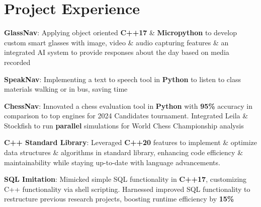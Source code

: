 \documentclass[letterpaper,11pt]{article}
\begin{document}
\section{Project Experience}
 \begin{itemize}[leftmargin=0.15in, label={}]
    \small{\item{

    \textbf{GlassNav}{: Applying object oriented \textbf{C++17} \& 
\textbf{Micropython} to develop custom smart glasses with image, video \& 
audio capturing features \& an integrated AI system to provide responses 
about the day based on media recorded}

    \textbf{SpeakNav}{: Implementing a text to speech tool in 
\textbf{Python} to listen to class materials walking or in bus, saving 
time}

    \textbf{ChessNav}{: Innovated a chess evaluation tool in 
\textbf{Python} with \textbf{95\%} accuracy in comparison to top engines 
for 2024 Candidates tournament. Integrated Leila \& Stockfish to run 
\textbf{parallel} simulations for World Chess Championship analysis}

    \textbf{C++ Standard Library}{: Leveraged \textbf{C++20} features to  
implement \& optimize data structures \& algorithms in standard library, 
enhancing code efficiency \& maintainability while staying up-to-date with 
language advancements.} $ $

     \textbf{SQL Imitation}{: Mimicked simple SQL functionality in 
\textbf{C++17}, customizing C++ functionality via shell scripting. 
Harnessed improved SQL functionality to restructure previous research 
projects, boosting runtime efficiency by \textbf{15\%}} $ $

    }}
 \end{itemize}


    
\end{document}
